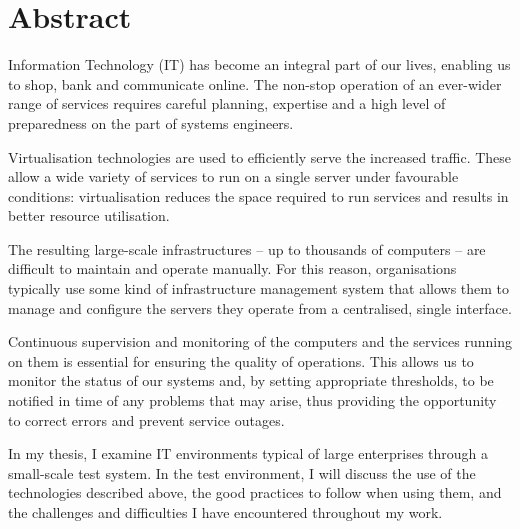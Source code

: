 \chapter*{Abstract}

Information Technology (IT) has become an integral part of our lives, enabling us to shop, bank and communicate online. The non-stop operation of an ever-wider range of services requires careful planning, expertise and a high level of preparedness on the part of systems engineers.

Virtualisation technologies are used to efficiently serve the increased traffic. These allow a wide variety of services to run on a single server under favourable conditions: virtualisation reduces the space required to run services and results in better resource utilisation.

The resulting large-scale infrastructures -- up to thousands of computers -- are difficult to maintain and operate manually. For this reason, organisations typically use some kind of infrastructure management system that allows them to manage and configure the servers they operate from a centralised, single interface.

Continuous supervision and monitoring of the computers and the services running on them is essential for ensuring the quality of operations. This allows us to monitor the status of our systems and, by setting appropriate thresholds, to be notified in time of any problems that may arise, thus providing the opportunity to correct errors and prevent service outages.

In my thesis, I examine IT environments typical of large enterprises through a small-scale test system. In the test environment, I will discuss the use of the technologies described above, the good practices to follow when using them, and the challenges and difficulties I have encountered throughout my work.


\vfill
\selectthesislanguage

\setcounter{romanPage}{\value{page}}
